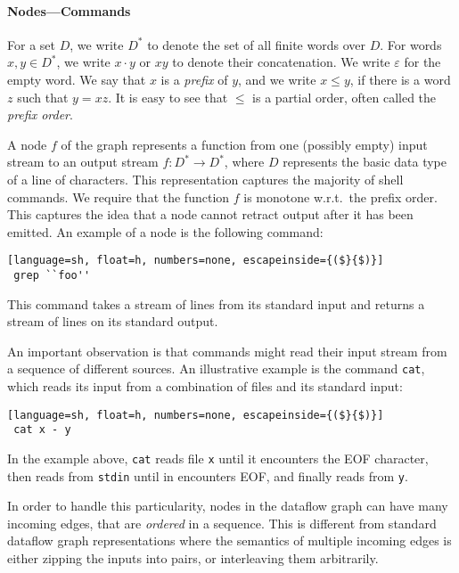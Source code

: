 \documentclass[acmsmall,10pt,review,anonymous]{acmart}
\newcommand{\ttt}[1]{\texttt{\small #1}}
\newcommand{\kstar}{^{\textstyle *}}
\newcommand{\eps}{\varepsilon}
\begin{document}
\paragraph{Nodes---Commands}

For a set $D$, we write $D\kstar$ to denote the set of all finite
words over $D$. For words $x, y \in D\kstar$, we write $x \cdot y$
or $xy$ to denote their concatenation. We write $\eps$ for the empty
word. We say that $x$ is a \emph{prefix} of $y$, and we write $x \leq y$, if there is a word $z$ such that $y = xz$. It is easy to see that $\leq$ is a partial order, often called the \emph{prefix order}.

A node $f$ of the graph represents a function from one (possibly empty)
input stream to an output stream $f : D\kstar \to D\kstar$, where $D$
represents the basic data type of a line of characters. This
representation captures the majority of shell commands. We require that
the function $f$ is monotone w.r.t.\ the prefix order. This captures
the idea that a node cannot retract output after it has been emitted.
An example of a node is the following command:

\begin{lstlisting}[language=sh, float=h, numbers=none, escapeinside={($}{$)}]
 grep ``foo''
\end{lstlisting}

\noindent
This command takes a stream of lines from its standard input and
returns a stream of lines on its standard output.

An important
observation is that commands might read their input
stream from a sequence of different sources. An illustrative example
is the command \ttt{cat}, which reads its input from a combination
of files and its standard input:

\begin{lstlisting}[language=sh, float=h, numbers=none, escapeinside={($}{$)}]
 cat x - y
\end{lstlisting}

\noindent
In the example above, \ttt{cat} reads file \ttt{x} until it encounters the EOF
character, then reads from \ttt{stdin} until in encounters EOF, and finally reads from
\ttt{y}.

In order to handle this particularity, nodes in the
dataflow graph can have many incoming edges, that are \emph{ordered} in a
sequence. This is different from standard dataflow
graph representations where the semantics of multiple incoming edges
is either zipping the inputs into pairs, or interleaving them arbitrarily.
\end{document}

